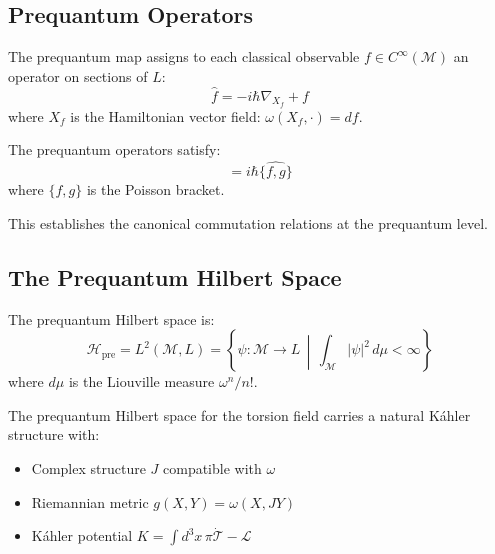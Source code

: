 \subsection{Prequantum Operators}

\begin{definition}
The prequantum map assigns to each classical observable $f \in C^\infty(\mathcal{M})$ an operator on sections of $L$:
\begin{equation}
    \hat{f} = -i\hbar \nabla_{X_f} + f
\end{equation}
where $X_f$ is the Hamiltonian vector field: $\omega(X_f, \cdot) = df$.
\end{definition}

\begin{theorem}
The prequantum operators satisfy:
\begin{equation}
    [\hat{f}, \hat{g}] = i\hbar \widehat{\{f, g\}}
\end{equation}
where $\{f, g\}$ is the Poisson bracket.
\end{theorem}

This establishes the canonical commutation relations at the prequantum level.

\subsection{The Prequantum Hilbert Space}

\begin{definition}
The prequantum Hilbert space is:
\begin{equation}
    \mathcal{H}_{\text{pre}} = L^2(\mathcal{M}, L) = \left\{ \psi : \mathcal{M} \to L \, \middle| \, \int_{\mathcal{M}} |\psi|^2 \, d\mu < \infty \right\}
\end{equation}
where $d\mu$ is the Liouville measure $\omega^n/n!$.
\end{definition}

\begin{theorem}
The prequantum Hilbert space for the torsion field carries a natural K\'{a}hler structure with:
\begin{itemize}
    \item Complex structure $J$ compatible with $\omega$
    \item Riemannian metric $g(X, Y) = \omega(X, JY)$
    \item K\'{a}hler potential $K = \int d^3x \, \pi \dot{\mathcal{T}} - \mathcal{L}$
\end{itemize}
\end{theorem}

